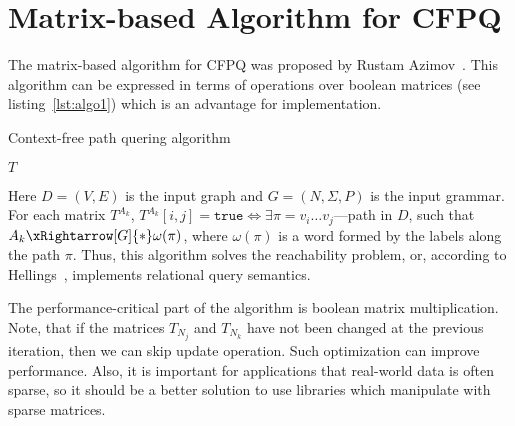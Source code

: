 \section{Matrix-based Algorithm for CFPQ}

The matrix-based algorithm for CFPQ was proposed by Rustam Azimov~\cite{Azimov:2018:CPQ:3210259.3210264}.
This algorithm can be expressed in terms of operations over boolean matrices (see listing~\ref{lst:algo1}) which is an advantage for implementation.

\begin{algorithm}
\begin{algorithmic}[1]
\caption{Context-free path quering algorithm}
\label{lst:algo1}

        \EndFor
    \EndFor
    \EndFor

        \EndFor
    \EndWhile
\State \Return $T$
\EndFunction
\end{algorithmic}
\end{algorithm}

Here $D = (V, E)$ is the input graph and $G = (N,\Sigma,P)$ is the input grammar.
For each matrix $T^{A_k}$, $T^{A_k}[i,j] = \texttt{true} \iff \exists \pi = v_i \ldots v_j $---path in $D$, such that $A_k \xRightarrow[G]{*} \omega(\pi) $, where $\omega(\pi)$ is a word formed by the labels along the path $\pi$.
Thus, this algorithm solves the reachability problem, or, according to Hellings~\cite{hellingsRelational}, implements relational query semantics.

The performance-critical part of the algorithm is boolean matrix multiplication.
Note, that if the matrices $T_{N_j}$ and $T_{N_k}$ have not been changed at the previous iteration, then we can skip update operation.
Such optimization can improve performance.
Also, it is important for applications that real-world data is often sparse, so it should be a better solution to use libraries which manipulate with sparse matrices.
